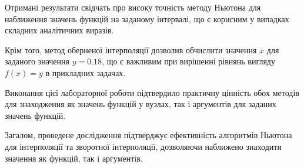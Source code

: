 \documentclass[a4paper, 12pt]{article}
\begin{document}
Отримані результати свідчать про високу точність методу Ньютона для наближення значень функцій на заданому інтервалі, що є корисним у випадках складних аналітичних виразів.

Крім того, метод оберненої інтерполяції дозволив обчислити значення $x$ для заданого значення $y=0.18$, що є важливим при вирішенні рівнянь вигляду $f(x) = y$ в прикладних задачах.

Виконання цієї лабораторної роботи підтвердило практичну цінність обох методів для знаходження як значень функцій у вузлах, так і аргументів для заданих значень функцій.

Загалом, проведене дослідження підтверджує ефективність алгоритмів Ньютона для інтерполяції та зворотної інтерполяції, дозволяючи наближено знаходити значення як функцій, так і аргументів.
\end{document}
